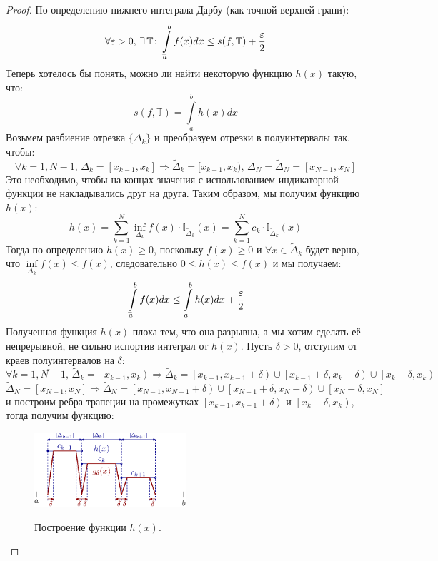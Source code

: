 \documentclass[12pt]{article}
\newcommand{\MTB}{\mathbb{T}}
\newcommand{\MTI}{\mathbb{I}}
\newcommand{\VE}{\varepsilon}
\theoremstyle{definition}
\newcommand{\ddint}[2]{\displaystyle\int\limits_{#1}^{#2}}
\newcommand{\wte}[1]{\widetilde{#1}}
\def\lowint{\mkern3mu\underline{\vphantom{\intop}\mkern7mu}\mkern-10mu\int}
\begin{document}
\begin{proof}
	По определению нижнего интеграла Дарбу (как точной верхней грани):
	$$
		\forall \VE > 0, \, \exists \, \MTB \colon \lowint\limits_{a}^{b}f(x)dx \leq s(f,\MTB) + \dfrac{\VE}{2}  
	$$
	Теперь хотелось бы понять, можно ли найти некоторую функцию $h(x)$ такую, что:
	$$
		s(f,\MTB) = \ddint{a}{b}h(x)dx
	$$
	Возьмем разбиение отрезка $\{\Delta_k\}$ и преобразуем отрезки в полуинтервалы так, чтобы:
	$$
		\forall k = \overline{1,N-1}, \, \Delta_k = [x_{k-1}, x_k] \Rightarrow \wte{\Delta}_k = [x_{k-1}, x_k), \, \Delta_N = \wte{\Delta}_N = [x_{N-1}, x_N]
	$$
	Это необходимо, чтобы на концах значения с использованием индикаторной функции не накладывались друг на друга. Таким образом, мы получим функцию $h(x)$:
	$$
		h(x) = \sum\limits_{k = 1}^N \inf\limits_{\Delta_k} f(x){\cdot}\MTI_{\wte{\Delta}_k}(x) = \sum\limits_{k = 1}^N c_k {\cdot}\MTI_{\wte{\Delta}_k}(x)
	$$
	Тогда по определению $h(x) \geq 0$, поскольку $f(x) \geq 0$ и $\forall x \in \wte{\Delta}_k$ будет верно, что $\inf\limits_{\Delta_k}f(x) \leq f(x)$, следовательно $0 \leq h(x) \leq f(x)$ и мы получаем:
	$$
		\lowint\limits_{a}^{b}f(x)dx \leq \ddint{a}{b}h(x)dx + \dfrac{\VE}{2}
	$$
	Полученная функция $h(x)$ плоха тем, что она разрывна, а мы хотим сделать её непрерывной, не сильно испортив интеграл от $h(x)$. Пусть $\delta > 0$, отступим от краев полуинтервалов на $\delta$: 
	$$
		\forall k = \overline{1,N-1},\, \wte{\Delta}_k = \left[x_{k-1}, x_k\right) \Rightarrow \wte{\Delta}_k = \left[x_{k-1}, x_{k-1}+\delta\right) \cup \left[x_{k-1} + \delta, x_k - \delta\right) \cup \left[x_k - \delta, x_k\right)
	$$
	$$
		\wte{\Delta}_N = \left[x_{N-1}, x_N\right] \Rightarrow \wte{\Delta}_N = \left[x_{N-1}, x_{N-1}+\delta \right) \cup\left[x_{N-1} + \delta, x_N - \delta\right) \cup \left[x_N - \delta, x_N\right]
	$$
	и построим ребра трапеции на промежутках $\left[x_{k-1}, x_{k-1}+\delta\right)$ и $\left[x_k - \delta, x_k\right)$, тогда получим функцию:
	\begin{figure}[H]
		\centering
		\includegraphics[width=0.5\textwidth]{MA3L13_5.eps}
		\label{MA3L13_5}
		\caption{Построение функции $h(x)$.}
		\label{fig:построение h(x)}
	\end{figure}

\end{proof}
\end{document}
